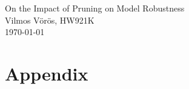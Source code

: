 \documentclass[12pt]{article}
\begin{document}
\pagestyle{fancy}

\begin{titlepage} 
    \centering
    \vspace*{\fill}
    
    {\large On the Impact of Pruning on Model Robustness} \\[2cm]
    {Vilmos Vörös, HW921K} \\[1cm]
    {\today}

    \vspace*{\fill}

\end{titlepage} 

\tableofcontents

\pagebreak















\appendix
\section{Appendix}

\end{document}
